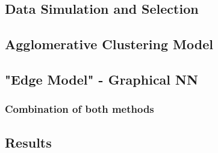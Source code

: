 \subsection{Data Simulation and Selection}

\subsection{Agglomerative Clustering Model}

\subsection{"Edge Model" - Graphical NN}

\subsubsection{Combination of both methods}


\subsection{Results}


